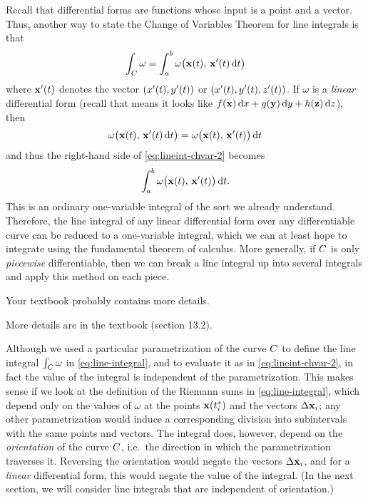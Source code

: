 \documentclass[12pt]{amsart}
\begin{document}
Recall that differential forms are functions whose input is a point and a vector.
Thus, another way to state the Change of Variables Theorem for line integrals is that
\begin{equation}
  \int_{C} \omega = \int_a^b \omega\big(\mathbf{x}(t),\, \mathbf{x}'(t) \,{\mathrm{d} t}\big)\label{eq:lineint-chvar-2}
\end{equation}
where $\mathbf{x}'(t)$ denotes the vector $(x'(t),y'(t))$ or $(x'(t),y'(t),z'(t))$.
If $\omega$ is a \emph{linear} differential form (recall that means it looks like $f(\mathbf{x})\,{\mathrm{d} x} + g(\mathbf{y})\,{\mathrm{d} y} + h(\mathbf{z})\,{\mathrm{d} z}$), then
\[ \omega\big(\mathbf{x}(t),\, \mathbf{x}'(t) \,{\mathrm{d} t}\big) = \omega\big(\mathbf{x}(t),\, \mathbf{x}'(t)\big)\,{\mathrm{d} t} \]
and thus the right-hand side of \cref{eq:lineint-chvar-2} becomes
\[ \int_a^b \omega\big(\mathbf{x}(t),\, \mathbf{x}'(t)\big)\,{\mathrm{d} t}. \]
This is an ordinary one-variable integral of the sort we already understand.
Therefore, the line integral of any linear differential form over any differentiable curve can be reduced to a one-variable integral, which we can at least hope to integrate using the fundamental theorem of calculus.
More generally, if $C$ is only \emph{piecewise} differentiable, then we can break a line integral up into several integrals and apply this method on each piece.
\begin{notextbook}Your textbook probably contains more details.\end{notextbook}
\begin{stewart}More details are in the textbook (section 13.2).\end{stewart}

\begin{rmk}\label{rmk:lineint-orientation}
  Although we used a particular parametrization of the curve $C$ to define the line integral $\int_{C} \omega$ in \cref{eq:line-integral}, and to evaluate it as in \cref{eq:lineint-chvar-2}, in fact the value of the integral is independent of the parametrization.
  This makes sense if we look at the definition of the Riemann sums in \cref{eq:line-integral}, which depend only on the values of $\omega$ at the points $\mathbf{x}({t}_{i}^*)$ and the vectors $\Delta \mathbf{x}_i$; any other parametrization would induce a corresponding division into subintervals with the same points and vectors.
  The integral does, however, depend on the \emph{orientation} of the curve $C$, i.e.\ the direction in which the parametrization traverses it.
  Reversing the orientation would negate the vectors $\Delta \mathbf{x}_i$, and for a \emph{linear} differential form, this would negate the value of the integral.
  (In the next section, we will consider line integrals that are independent of orientation.)
\end{rmk}
\end{document}
